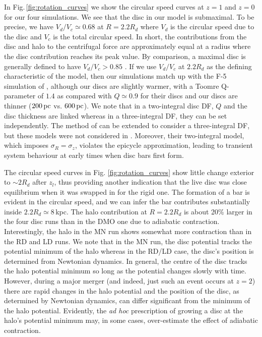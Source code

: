 In Fig.\,\ref{fig:rotation_curves} we show the circular speed curves
at $z=1$ and $z=0$ for our four simulations.  We see that the disc in
our model is submaximal.  To be precise, we have $V_d/V_c \simeq 0.68$
at $R=2.2R_d$ where $V_d$ is the circular speed due to the disc and
$V_c$ is the total circular speed.  In short, the contributions from
the disc and halo to the centrifugal force are approximately equal at
a radius where the disc contribution reaches its peak value.  By
comparison, a maximal disc is generally defined to have $V_d/V_c >
0.85$ \citep{sackett1997}.  If we use $V_d/V_c$ at $2.2R_d$ as the
defining characteristic of the model, then our simulations match up
with the F-5 simulation of
\citet{YurinSpringelStellarDisks}, although our discs are slightly
warmer, with a Toomre Q-parameter of $1.4$ as compared with $Q\simeq
0.9$ for their discs and our discs are thinner ($200\,{\rm pc}$ vs.
$600\,{\rm pc}$). We note that in a two-integral disc DF, $Q$ and the
disc thickness are linked whereas in a three-integral DF, they can be
set independently.  The method of \citet{YurinSpringelGalic} can be extended to consider
a three-integral DF, but these models were not considered in  \citet{YurinSpringelStellarDisks}. Moreover, their two-integral model, 
which imposes $\sigma_R=\sigma_z$, violates the epicycle approximation,
leading to transient system behaviour at early times when disc bars
first form.


The circular speed curves in Fig. \ref{fig:rotation_curves} show little change exterior to $\sim 2R_d$
after $z_l$, thus providing another indication that the live disc
was close equilibrium when it was swapped in for the rigid one. The
formation of a bar is evident in the circular speed, and we can infer
the bar contributes substantially inside $2.2 R_d \simeq 8$\,kpc.  The halo contribution at $R=2.2R_d$ is about 20\% larger
in the four disc runs than in the DMO one due to adiabatic
contraction.  Interestingly, the halo in the MN run shows
somewhat more contraction than in the RD and LD runs.  We note that in
the MN run, the disc potential tracks the potential minimum of the
halo whereas in the RD/LD case, the disc's position is determined from
Newtonian dynamics.  In general, the centre of the disc tracks the
halo potential minimum so long as the potential changes slowly with
time.  However, during a major merger (and indeed, just such an event
occurs at $z=2$) there are rapid changes in the halo potential and 
the position of the disc, as determined by Newtonian dynamics, can
differ significant from the minimum of the halo potential.  Evidently,
the {\it ad hoc} prescription of growing a disc at the halo's
potential minimum may, in some cases, over-estimate the effect of
adiabatic contraction.

